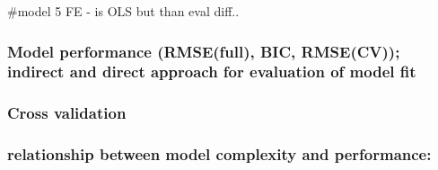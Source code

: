\documentclass[
]{article}
\begin{document}
\#model 5 FE - is OLS but than eval diff..

\hypertarget{model-performance-rmsefull-bic-rmsecv-indirect-and-direct-approach-for-evaluation-of-model-fit}{%
\subsubsection{Model performance (RMSE(full), BIC, RMSE(CV)); indirect
and direct approach for evaluation of model
fit}\label{model-performance-rmsefull-bic-rmsecv-indirect-and-direct-approach-for-evaluation-of-model-fit}}

\hypertarget{cross-validation}{%
\subsubsection{Cross validation}\label{cross-validation}}

\hypertarget{relationship-between-model-complexity-and-performance}{%
\subsubsection{relationship between model complexity and
performance:}\label{relationship-between-model-complexity-and-performance}}
\end{document}
